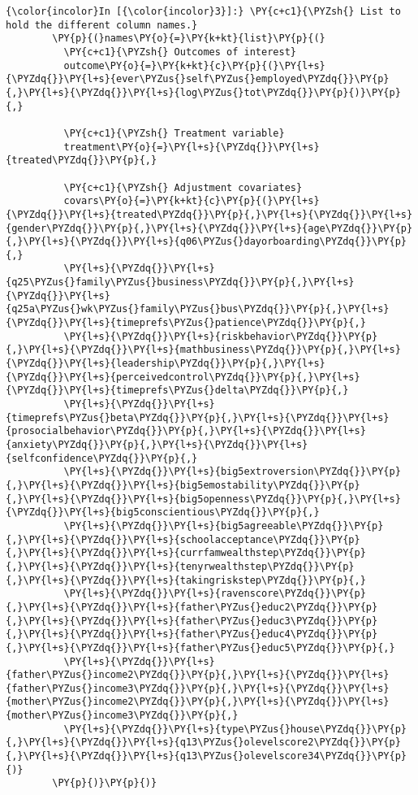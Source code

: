   \begin{Verbatim}[commandchars=\\\{\}]
{\color{incolor}In [{\color{incolor}3}]:} \PY{c+c1}{\PYZsh{} List to hold the different column names.}
        \PY{p}{(}names\PY{o}{=}\PY{k+kt}{list}\PY{p}{(}
          \PY{c+c1}{\PYZsh{} Outcomes of interest}
          outcome\PY{o}{=}\PY{k+kt}{c}\PY{p}{(}\PY{l+s}{\PYZdq{}}\PY{l+s}{ever\PYZus{}self\PYZus{}employed\PYZdq{}}\PY{p}{,}\PY{l+s}{\PYZdq{}}\PY{l+s}{log\PYZus{}tot\PYZdq{}}\PY{p}{)}\PY{p}{,}
        
          \PY{c+c1}{\PYZsh{} Treatment variable}
          treatment\PY{o}{=}\PY{l+s}{\PYZdq{}}\PY{l+s}{treated\PYZdq{}}\PY{p}{,}
        
          \PY{c+c1}{\PYZsh{} Adjustment covariates}
          covars\PY{o}{=}\PY{k+kt}{c}\PY{p}{(}\PY{l+s}{\PYZdq{}}\PY{l+s}{treated\PYZdq{}}\PY{p}{,}\PY{l+s}{\PYZdq{}}\PY{l+s}{gender\PYZdq{}}\PY{p}{,}\PY{l+s}{\PYZdq{}}\PY{l+s}{age\PYZdq{}}\PY{p}{,}\PY{l+s}{\PYZdq{}}\PY{l+s}{q06\PYZus{}dayorboarding\PYZdq{}}\PY{p}{,}
          \PY{l+s}{\PYZdq{}}\PY{l+s}{q25\PYZus{}family\PYZus{}business\PYZdq{}}\PY{p}{,}\PY{l+s}{\PYZdq{}}\PY{l+s}{q25a\PYZus{}wk\PYZus{}family\PYZus{}bus\PYZdq{}}\PY{p}{,}\PY{l+s}{\PYZdq{}}\PY{l+s}{timeprefs\PYZus{}patience\PYZdq{}}\PY{p}{,}
          \PY{l+s}{\PYZdq{}}\PY{l+s}{riskbehavior\PYZdq{}}\PY{p}{,}\PY{l+s}{\PYZdq{}}\PY{l+s}{mathbusiness\PYZdq{}}\PY{p}{,}\PY{l+s}{\PYZdq{}}\PY{l+s}{leadership\PYZdq{}}\PY{p}{,}\PY{l+s}{\PYZdq{}}\PY{l+s}{perceivedcontrol\PYZdq{}}\PY{p}{,}\PY{l+s}{\PYZdq{}}\PY{l+s}{timeprefs\PYZus{}delta\PYZdq{}}\PY{p}{,}
          \PY{l+s}{\PYZdq{}}\PY{l+s}{timeprefs\PYZus{}beta\PYZdq{}}\PY{p}{,}\PY{l+s}{\PYZdq{}}\PY{l+s}{prosocialbehavior\PYZdq{}}\PY{p}{,}\PY{l+s}{\PYZdq{}}\PY{l+s}{anxiety\PYZdq{}}\PY{p}{,}\PY{l+s}{\PYZdq{}}\PY{l+s}{selfconfidence\PYZdq{}}\PY{p}{,}
          \PY{l+s}{\PYZdq{}}\PY{l+s}{big5extroversion\PYZdq{}}\PY{p}{,}\PY{l+s}{\PYZdq{}}\PY{l+s}{big5emostability\PYZdq{}}\PY{p}{,}\PY{l+s}{\PYZdq{}}\PY{l+s}{big5openness\PYZdq{}}\PY{p}{,}\PY{l+s}{\PYZdq{}}\PY{l+s}{big5conscientious\PYZdq{}}\PY{p}{,}
          \PY{l+s}{\PYZdq{}}\PY{l+s}{big5agreeable\PYZdq{}}\PY{p}{,}\PY{l+s}{\PYZdq{}}\PY{l+s}{schoolacceptance\PYZdq{}}\PY{p}{,}\PY{l+s}{\PYZdq{}}\PY{l+s}{currfamwealthstep\PYZdq{}}\PY{p}{,}\PY{l+s}{\PYZdq{}}\PY{l+s}{tenyrwealthstep\PYZdq{}}\PY{p}{,}\PY{l+s}{\PYZdq{}}\PY{l+s}{takingriskstep\PYZdq{}}\PY{p}{,}
          \PY{l+s}{\PYZdq{}}\PY{l+s}{ravenscore\PYZdq{}}\PY{p}{,}\PY{l+s}{\PYZdq{}}\PY{l+s}{father\PYZus{}educ2\PYZdq{}}\PY{p}{,}\PY{l+s}{\PYZdq{}}\PY{l+s}{father\PYZus{}educ3\PYZdq{}}\PY{p}{,}\PY{l+s}{\PYZdq{}}\PY{l+s}{father\PYZus{}educ4\PYZdq{}}\PY{p}{,}\PY{l+s}{\PYZdq{}}\PY{l+s}{father\PYZus{}educ5\PYZdq{}}\PY{p}{,}
          \PY{l+s}{\PYZdq{}}\PY{l+s}{father\PYZus{}income2\PYZdq{}}\PY{p}{,}\PY{l+s}{\PYZdq{}}\PY{l+s}{father\PYZus{}income3\PYZdq{}}\PY{p}{,}\PY{l+s}{\PYZdq{}}\PY{l+s}{mother\PYZus{}income2\PYZdq{}}\PY{p}{,}\PY{l+s}{\PYZdq{}}\PY{l+s}{mother\PYZus{}income3\PYZdq{}}\PY{p}{,}
          \PY{l+s}{\PYZdq{}}\PY{l+s}{type\PYZus{}house\PYZdq{}}\PY{p}{,}\PY{l+s}{\PYZdq{}}\PY{l+s}{q13\PYZus{}olevelscore2\PYZdq{}}\PY{p}{,}\PY{l+s}{\PYZdq{}}\PY{l+s}{q13\PYZus{}olevelscore34\PYZdq{}}\PY{p}{)}
        \PY{p}{)}\PY{p}{)}
\end{Verbatim}


